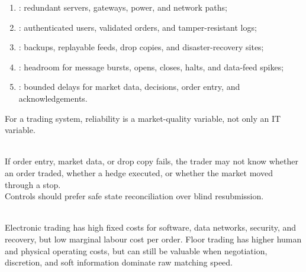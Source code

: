 \documentclass[a4paper,oneside,openany]{book}
\begin{document}
\begin{taxonomy} 
\begin{enumerate}[label=\roman*.]
\setlength{\itemsep}{0pt}
\item {}: redundant servers, gateways, power, and network paths;
\item {}: authenticated users, validated orders, and tamper-resistant logs;
\item {}: backups, replayable feeds, drop copies, and disaster-recovery sites;
\item {}: headroom for message bursts, opens, closes, halts, and data-feed spikes;
\item {}: bounded delays for market data, decisions, order entry, and acknowledgements.
\end{enumerate}
For a trading system, reliability is a market-quality variable, not only an IT variable.
\end{taxonomy}

\begin{caveat} \\
If order entry, market data, or drop copy fails, the trader may not know whether an order traded, whether a hedge executed, or whether the market moved through a stop.\\
Controls should prefer safe state reconciliation over blind resubmission.
\end{caveat}

\begin{mechanism} \\
Electronic trading has high fixed costs for software, data networks, security, and recovery, but low marginal labour cost per order. Floor trading has higher human and physical operating costs, but can still be valuable when negotiation, discretion, and soft information dominate raw matching speed.
\end{mechanism}
\end{document}
